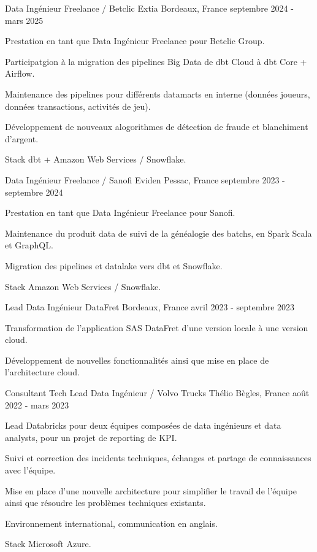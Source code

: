
\begin{cventries}
	\cventry
	{Data Ingénieur Freelance / Betclic}
	{Extia}
	{Bordeaux, France}
	{septembre 2024 - mars 2025}
	{
		\begin{cvitems}
			\item {Prestation en tant que Data Ingénieur Freelance pour Betclic Group.}
			\item {Participatgion à la migration des pipelines Big Data de dbt Cloud à dbt Core + Airflow.}
			\item {Maintenance des pipelines pour différents datamarts en interne (données joueurs, données transactions, activités de jeu).}
			\item {Développement de nouveaux alogorithmes de détection de fraude et blanchiment d'argent.}
			\item {Stack dbt + Amazon Web Services / Snowflake.}
		\end{cvitems}
	}

	\cventry
	{Data Ingénieur Freelance / Sanofi}
	{Eviden}
	{Pessac, France}
	{septembre 2023 - septembre 2024}
	{
		\begin{cvitems}
			\item {Prestation en tant que Data Ingénieur Freelance pour Sanofi.}
			\item {Maintenance du produit data de suivi de la généalogie des batchs, en Spark Scala et GraphQL.}
			\item {Migration des pipelines et datalake vers dbt et Snowflake.}
			\item {Stack Amazon Web Services / Snowflake.}
		\end{cvitems}
	}
	
	\cventry
	{Lead Data Ingénieur}
	{DataFret}
	{Bordeaux, France}
	{avril 2023 - septembre 2023}
	{
		\begin{cvitems}
			\item {Transformation de l'application SAS DataFret d'une version locale à une version cloud.}
			\item {Développement de nouvelles fonctionnalités ainsi que mise en place de l'architecture cloud.}
		\end{cvitems}
	}
	
	\cventry
	{Consultant Tech Lead Data Ingénieur / Volvo Trucks}
	{Thélio}
	{Bègles, France}
	{août 2022 - mars 2023}
	{
		\begin{cvitems}
			\item Lead Databricks pour deux équipes composées de data ingénieurs et data analysts, pour un projet de reporting de KPI.
			\item Suivi et correction des incidents techniques, échanges et partage de connaissances avec l'équipe.
			\item Mise en place d'une nouvelle architecture pour simplifier le travail de l'équipe ainsi que résoudre les problèmes techniques existants.
			\item Environnement international, communication en anglais.
			\item Stack Microsoft Azure.
		\end{cvitems}
	}
	

\end{cventries}
